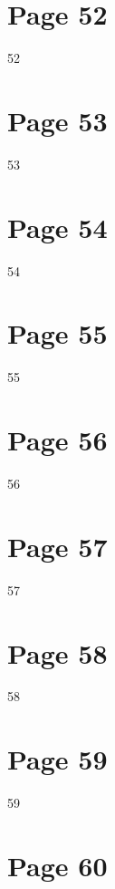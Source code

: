 \documentclass{article}
\begin{document}
\section*{Page 52}
   
 
 52  
 


\section*{Page 53}
   
 
 53  
 


\section*{Page 54}
   
 
 54  
 


\section*{Page 55}
   
 
 55  
 


\section*{Page 56}
   
 
 56  
 


\section*{Page 57}
   
 
 57  
 


\section*{Page 58}
   
 
 58  
 


\section*{Page 59}
   
 
 59  
 


\section*{Page 60}
   
\end{document}
